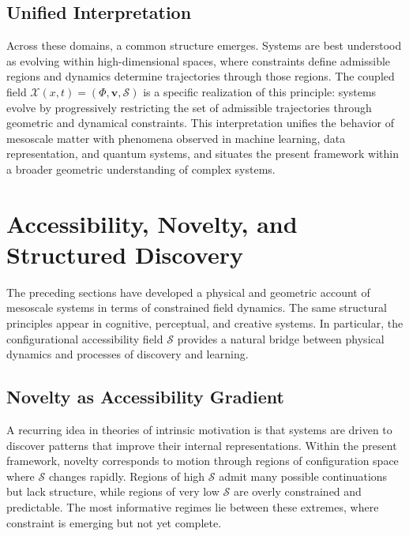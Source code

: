 \documentclass[11pt, a4paper, twocolumn]{article}
\newcommand{\X}{\mathcal{X}}
\newcommand{\Sfield}{\mathcal{S}}
\begin{document}
\subsection{Unified Interpretation}

Across these domains, a common structure emerges. Systems are best understood
as evolving within high-dimensional spaces, where constraints define admissible
regions and dynamics determine trajectories through those regions. The coupled
field $\X(x,t) = (\Phi, \mathbf{v}, \Sfield)$ is a specific realization of
this principle: systems evolve by progressively restricting the set of
admissible trajectories through geometric and dynamical constraints. This
interpretation unifies the behavior of mesoscale matter with phenomena observed
in machine learning, data representation, and quantum systems, and situates the
present framework within a broader geometric understanding of complex systems.

\section{Accessibility, Novelty, and Structured Discovery}

The preceding sections have developed a physical and geometric account of
mesoscale systems in terms of constrained field dynamics. The same structural
principles appear in cognitive, perceptual, and creative systems. In particular,
the configurational accessibility field $\Sfield$ provides a natural bridge
between physical dynamics and processes of discovery and learning.

\subsection{Novelty as Accessibility Gradient}

A recurring idea in theories of intrinsic motivation is that systems are driven
to discover patterns that improve their internal representations. Within the
present framework, novelty corresponds to motion through regions of configuration
space where $\Sfield$ changes rapidly. Regions of high $\Sfield$ admit many
possible continuations but lack structure, while regions of very low $\Sfield$
are overly constrained and predictable. The most informative regimes lie between
these extremes, where constraint is emerging but not yet complete.
\end{document}
